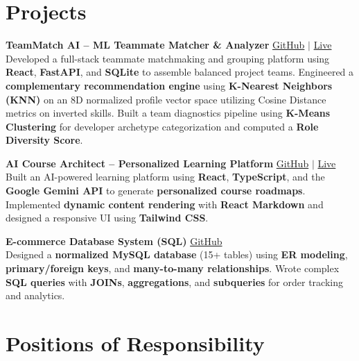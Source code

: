 \documentclass[8pt,letterpaper]{article}
\begin{document}
\section{Projects} 

\textbf{TeamMatch AI -- ML Teammate Matcher \& Analyzer} \hfill \href{https://github.com/ankit1824/TeamMatch-AI}{GitHub} $|$ \href{https://team-match-ai-xi.vercel.app/}{Live}\\
Developed a full-stack teammate matchmaking and grouping platform using \textbf{React}, \textbf{FastAPI}, and \textbf{SQLite} to assemble balanced project teams. Engineered a \textbf{complementary recommendation engine} using \textbf{K-Nearest Neighbors (KNN)} on an 8D normalized profile vector space utilizing Cosine Distance metrics on inverted skills. Built a team diagnostics pipeline using \textbf{K-Means Clustering} for developer archetype categorization and computed a \textbf{Role Diversity Score}.

\vspace{3pt}

\textbf{AI Course Architect -- Personalized Learning Platform} \hfill \href{https://github.com/ankit1824/AI-Course-Architect}{GitHub} $|$ \href{https://skillsurgefinal.vercel.app/}{Live}\\
Built an AI-powered learning platform using \textbf{React}, \textbf{TypeScript}, and the \textbf{Google Gemini API} to generate \textbf{personalized course roadmaps}. Implemented \textbf{dynamic content rendering} with \textbf{React Markdown} and designed a responsive UI using \textbf{Tailwind CSS}.

\vspace{3pt}

\textbf{E-commerce Database System (SQL)} \hfill \href{https://github.com/ankit1824/E-commerce-DB}{GitHub}\\
Designed a \textbf{normalized MySQL database} (15+ tables) using \textbf{ER modeling}, \textbf{primary/foreign keys}, and \textbf{many-to-many relationships}. Wrote complex \textbf{SQL queries} with \textbf{JOINs}, \textbf{aggregations}, and \textbf{subqueries} for order tracking and analytics.

\section{Positions of Responsibility}
\end{document}
